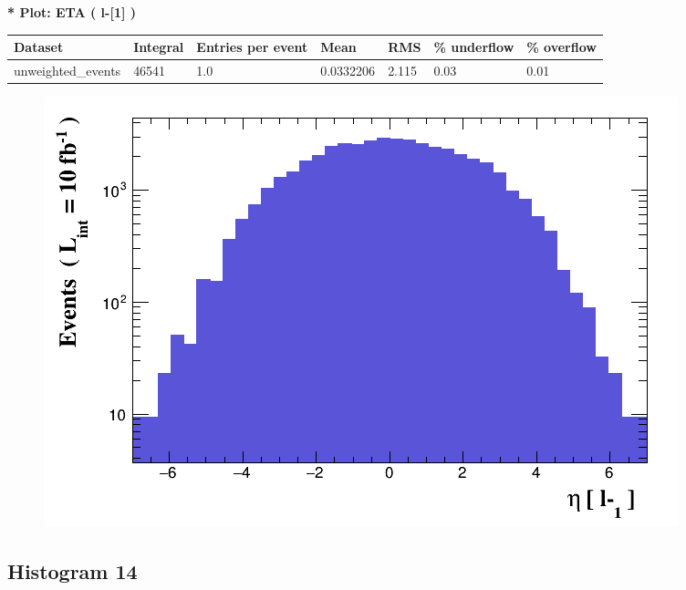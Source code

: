 \documentclass[a4paper, 10pt]{article}
\begin{document}
\textbf{* Plot: ETA ( l-[1] ) }\\
   \begin{table}[H]
  \begin{center}
    \begin{tabular}{|m{23.0mm}|m{23.0mm}|m{18.0mm}|m{19.0mm}|m{19.0mm}|m{19.0mm}|m{19.0mm}|}
      \hline
      {\cellcolor{yellow}         Dataset}& {\cellcolor{yellow}         Integral}& {\cellcolor{yellow}         Entries per event}& {\cellcolor{yellow}         Mean}& {\cellcolor{yellow}         RMS}& {\cellcolor{yellow}         \% underflow}& {\cellcolor{yellow}         \% overflow}\\
      \hline
      {\cellcolor{white}         unweighted\_events}& {\cellcolor{white}         46541}& {\cellcolor{white}         1.0}& {\cellcolor{white}         0.0332206}& {\cellcolor{white}         2.115}& {\cellcolor{green}         0.03}& {\cellcolor{green}         0.01}\\
\hline
    \end{tabular}
  \end{center}
\end{table}

\begin{figure}[H]
  \begin{center}
    \includegraphics[scale=0.45]{selection_12.png}\\
\caption{   }
  \end{center}
\end{figure}
      \newpage
\subsection{ Histogram 14}
\end{document}
